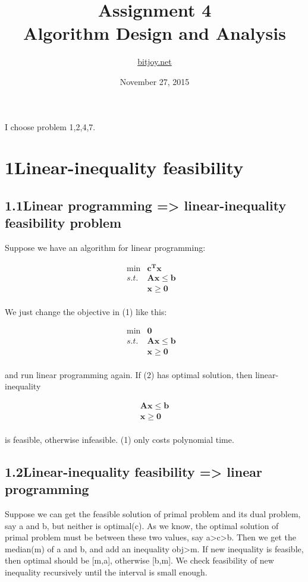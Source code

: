 \documentclass[a4paper,12pt]{article}
\title{Assignment 4\\Algorithm Design and Analysis}
\author{\href{http://bitjoy.net}{bitjoy.net}}
\date{November 27, 2015}
\begin{document}
\maketitle

I choose problem 1,2,4,7.

\section*{1\quad Linear-inequality feasibility}
\subsection*{\textnormal{1.1\quad Linear programming => linear-inequality feasibility problem}}

Suppose we have an algorithm for linear programming:

\[
\begin{array}{rrrrrrrrl}
 \min & \mathbf{c^T x }&   \\
 s.t. & \mathbf{A x \leq  b} &  \\ \tag{1}
      & \mathbf{x \geq 0} & \\
\end{array} \nonumber
\]

We just change the objective in (1) like this:

\[
\begin{array}{rrrrrrrrl}
 \min & \mathbf{0}&   \\
 s.t. & \mathbf{A x \leq  b} &  \\ \tag{2}
      & \mathbf{x \geq 0} & \\
\end{array} \nonumber
\]

and run linear programming again. If (2) has optimal solution, then linear-inequality

\[
\begin{array}{rrrrrrrrl}
& \mathbf{A x \leq  b} &  \\ \tag{3}
& \mathbf{x \geq 0} & \\
\end{array} \nonumber
\]

is feasible, otherwise infeasible. (1) only costs polynomial time.

\subsection*{\textnormal{1.2\quad Linear-inequality feasibility => linear programming}}

Suppose we can get the feasible solution of primal problem and its dual problem, say a and b, but neither is optimal(c). As we know, the optimal solution of primal problem must be between these two values, say a>c>b. Then we get the median(m) of a and b, and add an inequality obj>m. If new inequality is feasible, then optimal should be [m,a], otherwise [b,m]. We check feasibility of new inequality recursively until the interval is small enough.
\end{document}
